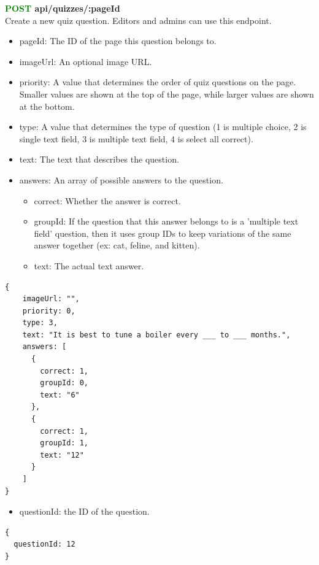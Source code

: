 \documentclass[onecolumn, draftclsnofoot,10pt, compsoc, usenames, dvipsnames]{IEEEtran}
\begin{document}
\noindent
\textbf{\textcolor{Green}{POST} api/quizzes/:pageId} \\
Create a new quiz question. Editors and admins can use this endpoint.
\begin{itemize}
    \item pageId: The ID of the page this question belongs to.
    \item imageUrl: An optional image URL.
    \item priority: A value that determines the order of quiz questions on the page. Smaller values are shown at the top of the page, while larger values are shown at the bottom.
    \item type: A value that determines the type of question (1 is multiple choice, 2 is single text field, 3 is multiple text field, 4 is select all correct).
    \item text: The text that describes the question.
    \item answers: An array of possible answers to the question.
        \begin{itemize}
          \item correct: Whether the answer is correct.
          \item groupId: If the question that this answer belongs to is a 'multiple text field' question, then it uses group IDs to keep variations of the same answer together (ex: cat, feline, and kitten).
          \item text: The actual text answer.
        \end{itemize}
\end{itemize}
\begin{lstlisting}[caption=Example Request Body]
{
    imageUrl: "",
    priority: 0,
    type: 3,
    text: "It is best to tune a boiler every ___ to ___ months.",
    answers: [
      {
        correct: 1,
        groupId: 0,
        text: "6"
      },
      {
        correct: 1,
        groupId: 1,
        text: "12"
      }
    ]
}
\end{lstlisting}
\begin{itemize}
    \item questionId: the ID of the question.
\end{itemize}
\begin{lstlisting}[caption=Example Response]
{
  questionId: 12
}
\end{lstlisting}
\\~\\
\end{document}
